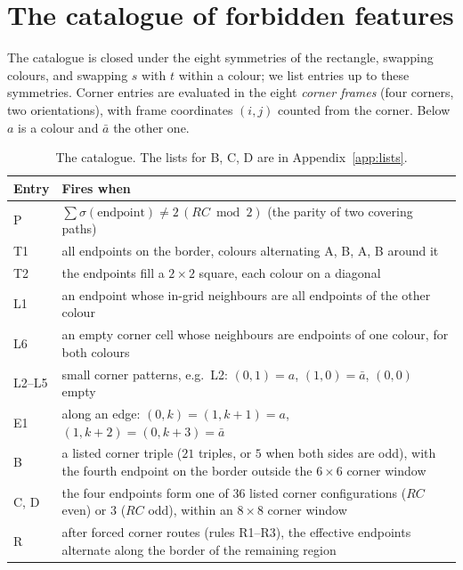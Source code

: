 \documentclass[11pt]{article}
\newcommand{\cA}{\textsf{A}\xspace}
\newcommand{\cB}{\textsf{B}\xspace}
\begin{document}
\section{The catalogue of forbidden features}\label{sec:catalogue}

The catalogue is closed under the eight symmetries of the rectangle, swapping colours, and swapping
$s$ with $t$ within a colour; we list entries up to these symmetries. Corner entries are evaluated
in the eight \emph{corner frames} (four corners, two orientations), with frame coordinates
$(i, j)$ counted from the corner. Below $a$ is a colour and $\bar a$ the other one.

\begin{table}[ht]
\centering
\small
\begin{tabular}{@{}lp{}@{}}
\toprule
Entry & Fires when \\
\midrule
P & $\sum \sigma(\text{endpoint}) \ne 2\,(RC \bmod 2)$ (the parity of two covering paths) \\
T1 & all endpoints on the border, colours alternating \cA, \cB, \cA, \cB around it \\
T2 & the endpoints fill a $2\times2$ square, each colour on a diagonal \\
L1 & an endpoint whose in-grid neighbours are all endpoints of the other colour \\
L6 & an empty corner cell whose neighbours are endpoints of one colour, for both colours \\
L2--L5 & small corner patterns, e.g.\ L2: $(0,1) = a$, $(1,0) = \bar a$, $(0,0)$ empty \\
E1 & along an edge: $(0,k) = (1,k{+}1) = a$, $(1,k{+}2) = (0,k{+}3) = \bar a$ \\
B & a listed corner triple ($21$ triples, or $5$ when both sides are odd), with the fourth
    endpoint on the border outside the $6\times6$ corner window \\
C, D & the four endpoints form one of $36$ listed corner configurations ($RC$ even) or $3$ ($RC$
    odd), within an $8\times8$ corner window \\
R & after forced corner routes (rules R1--R3), the effective endpoints alternate along the border
    of the remaining region \\
\bottomrule
\end{tabular}
\caption{The catalogue. The lists for B, C, D are in Appendix~\ref{app:lists}.}
\label{tab:catalogue}
\end{table}
\end{document}
